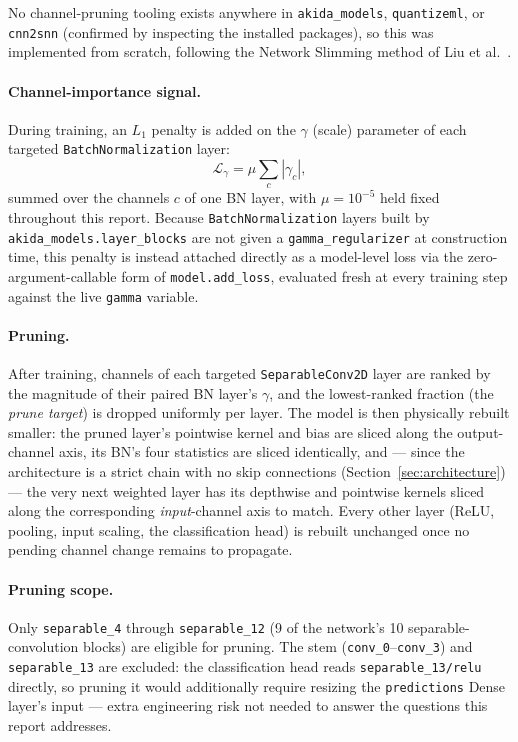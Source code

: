 \documentclass[11pt]{article}
\newcommand{\code}[1]{\texttt{#1}}
\begin{document}
No channel-pruning tooling exists anywhere in \code{akida\_models}, \code{quantizeml}, or \code{cnn2snn} (confirmed by inspecting the installed packages), so this was implemented from scratch, following the Network Slimming method of Liu et al.\ \cite{networkslimming}.

\paragraph{Channel-importance signal.} During training, an $L_1$ penalty is added on the $\gamma$ (scale) parameter of each targeted \code{BatchNormalization} layer:
\begin{equation}
\mathcal{L}_{\gamma} = \mu \sum_{c} |\gamma_c|,
\end{equation}
summed over the channels $c$ of one BN layer, with $\mu = 10^{-5}$ held fixed throughout this report. Because \code{BatchNormalization} layers built by \code{akida\_models.layer\_blocks} are not given a \code{gamma\_regularizer} at construction time, this penalty is instead attached directly as a model-level loss via the zero-argument-callable form of \code{model.add\_loss}, evaluated fresh at every training step against the live \code{gamma} variable.

\paragraph{Pruning.} After training, channels of each targeted \code{SeparableConv2D} layer are ranked by the magnitude of their paired BN layer's $\gamma$, and the lowest-ranked fraction (the \emph{prune target}) is dropped uniformly per layer. The model is then physically rebuilt smaller: the pruned layer's pointwise kernel and bias are sliced along the output-channel axis, its BN's four statistics are sliced identically, and --- since the architecture is a strict chain with no skip connections (Section~\ref{sec:architecture}) --- the very next weighted layer has its depthwise and pointwise kernels sliced along the corresponding \emph{input}-channel axis to match. Every other layer (ReLU, pooling, input scaling, the classification head) is rebuilt unchanged once no pending channel change remains to propagate.

\paragraph{Pruning scope.} Only \code{separable\_4} through \code{separable\_12} (9 of the network's 10 separable-convolution blocks) are eligible for pruning. The stem (\code{conv\_0}--\code{conv\_3}) and \code{separable\_13} are excluded: the classification head reads \code{separable\_13/relu} directly, so pruning it would additionally require resizing the \code{predictions} Dense layer's input --- extra engineering risk not needed to answer the questions this report addresses.
\end{document}

